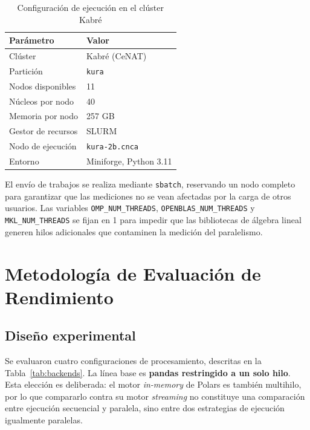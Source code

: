 \documentclass[conference]{IEEEtran}
\begin{document}
\begin{table}[t]
\caption{Configuración de ejecución en el clúster Kabré}
\label{tab:kabre}
\centering
\renewcommand{\arraystretch}{1.25}
\begin{tabular}{p{2.6cm} p{4.9cm}}
\toprule
\textbf{Parámetro} & \textbf{Valor} \\
\midrule
Clúster & Kabré (CeNAT) \\
Partición & \texttt{kura} \\
Nodos disponibles & 11 \\
Núcleos por nodo & 40 \\
Memoria por nodo & 257 GB \\
Gestor de recursos & SLURM \\
Nodo de ejecución & \texttt{kura-2b.cnca} \\
Entorno & Miniforge, Python 3.11 \\
\bottomrule
\end{tabular}
\end{table}

El envío de trabajos se realiza mediante \texttt{sbatch}, reservando un nodo completo para garantizar que las mediciones no se vean afectadas por la carga de otros usuarios. Las variables \texttt{OMP\_NUM\_THREADS}, \texttt{OPENBLAS\_NUM\_THREADS} y \texttt{MKL\_NUM\-\_THREADS} se fijan en 1 para impedir que las bibliotecas de álgebra lineal generen hilos adicionales que contaminen la medición del paralelismo.

\section{Metodología de Evaluación de Rendimiento}
\label{sec:metodologia}

\subsection{Diseño experimental}
Se evaluaron cuatro configuraciones de procesamiento, descritas en la Tabla~\ref{tab:backends}. La línea base es \textbf{pandas restringido a un solo hilo}. Esta elección es deliberada: el motor \textit{in-memory} de Polars es también multihilo, por lo que compararlo contra su motor \textit{streaming} no constituye una comparación entre ejecución secuencial y paralela, sino entre dos estrategias de ejecución igualmente paralelas.
\end{document}
